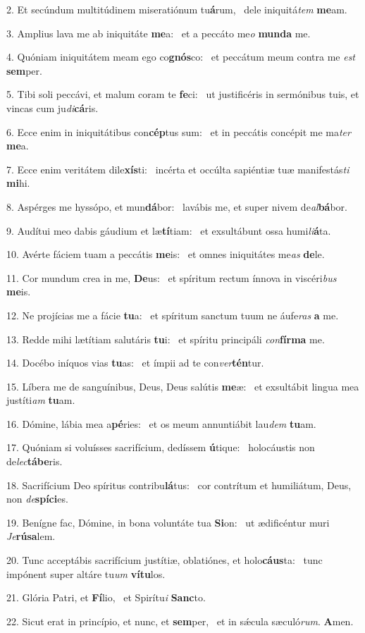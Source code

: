 2. Et secúndum multitúdinem miseratiónum tu\textbf{á}rum, \ast\  dele iniquitá\textit{tem} \textbf{me}am.\

3. Amplius lava me ab iniquitáte \textbf{me}a: \ast\  et a peccáto me\textit{o} \textbf{mun}\textbf{da} me.\

4. Quóniam iniquitátem meam ego co\textbf{gnós}co: \ast\  et peccátum meum contra me \textit{est} \textbf{sem}per.\

5. Tibi soli peccávi, et malum coram te \textbf{fe}ci: \ast\  ut justificéris in sermónibus tuis, et vincas cum ju\textit{di}\textbf{cá}ris.\

6. Ecce enim in iniquitátibus con\textbf{cép}tus sum: \ast\  et in peccátis concépit me ma\textit{ter} \textbf{me}a.\

7. Ecce enim veritátem dile\textbf{xís}ti: \ast\  incérta et occúlta sapiéntiæ tuæ manifestás\textit{ti} \textbf{mi}hi.\

8. Aspérges me hyssópo, et mun\textbf{dá}bor: \ast\  lavábis me, et super nivem de\textit{al}\textbf{bá}bor.\

9. Audítui meo dabis gáudium et læ\textbf{tí}tiam: \ast\  et exsultábunt ossa humi\textit{li}\textbf{á}ta.\

10. Avérte fáciem tuam a peccátis \textbf{me}is: \ast\  et omnes iniquitátes me\textit{as} \textbf{de}le.\

11. Cor mundum crea in me, \textbf{De}us: \ast\  et spíritum rectum ínnova in viscéri\textit{bus} \textbf{me}is.\

12. Ne projícias me a fácie \textbf{tu}a: \ast\  et spíritum sanctum tuum ne áufe\textit{ras} \textbf{a} me.\

13. Redde mihi lætítiam salutáris \textbf{tu}i: \ast\  et spíritu principáli \textit{con}\textbf{fír}\textbf{ma} me.\

14. Docébo iníquos vias \textbf{tu}as: \ast\  et ímpii ad te con\textit{ver}\textbf{tén}tur.\

15. Líbera me de sanguínibus, Deus, Deus salútis \textbf{me}æ: \ast\  et exsultábit lingua mea justíti\textit{am} \textbf{tu}am.\

16. Dómine, lábia mea a\textbf{pé}ries: \ast\  et os meum annuntiábit lau\textit{dem} \textbf{tu}am.\

17. Quóniam si voluísses sacrifícium, dedíssem \textbf{ú}tique: \ast\  holocáustis non de\textit{lec}\textbf{tá}\textbf{be}ris.\

18. Sacrifícium Deo spíritus contribu\textbf{lá}tus: \ast\  cor contrítum et humiliátum, Deus, non \textit{de}\textbf{spí}\textbf{ci}es.\

19. Benígne fac, Dómine, in bona voluntáte tua \textbf{Si}on: \ast\  ut ædificéntur muri \textit{Je}\textbf{rú}\textbf{sa}lem.\

20. Tunc acceptábis sacrifícium justítiæ, oblatiónes, et holo\textbf{cáus}ta: \ast\  tunc impónent super altáre tu\textit{um} \textbf{ví}\textbf{tu}los.\

21. Glória Patri, et \textbf{Fí}lio, \ast\  et Spirítu\textit{i} \textbf{Sanc}to.\

22. Sicut erat in princípio, et nunc, et \textbf{sem}per, \ast\  et in sǽcula sæculó\textit{rum}. \textbf{A}men.\

